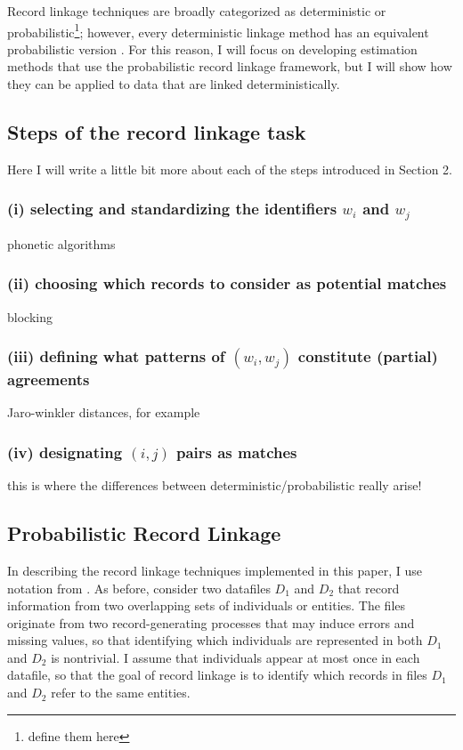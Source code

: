 \documentclass[12pt]{article}
\begin{document}
Record linkage techniques are broadly categorized as deterministic or probabilistic\footnote{define them here}; however, every deterministic linkage method has an equivalent probabilistic version \citep{harron2018}.  For this reason, I will focus on developing estimation methods that use the probabilistic record linkage framework, but I will show how they can be applied to data that are linked deterministically.  

\subsection{Steps of the record linkage task}

Here I will write a little bit more about each of the steps introduced in Section 2. 

\subsubsection*{(i) selecting and standardizing the identifiers $w_i$ and $w_j$}
phonetic algorithms

\subsubsection*{(ii) choosing which records to consider as potential matches}
blocking 

\subsubsection*{(iii) defining what patterns of $(w_i,w_j)$ constitute (partial) agreements}
Jaro-winkler distances, for example  

\subsubsection{(iv) designating $(i,j)$ pairs as matches}
this is where the differences between deterministic/probabilistic really arise! 

\subsection{Probabilistic Record Linkage}
In describing the record linkage techniques implemented in this paper, I use notation from \cite{fellegi69}.  As before, consider two datafiles $D_1$ and $D_2$ that record information from two overlapping sets of individuals or entities.  The files originate from two record-generating processes that may induce errors and missing values, so that identifying which individuals are represented in both $D_1$ and $D_2$ is nontrivial.  I assume that individuals appear at most once in each datafile, so that the goal of record linkage is to identify which records in files $D_1$ and $D_2$ refer to the same entities.
\end{document}
